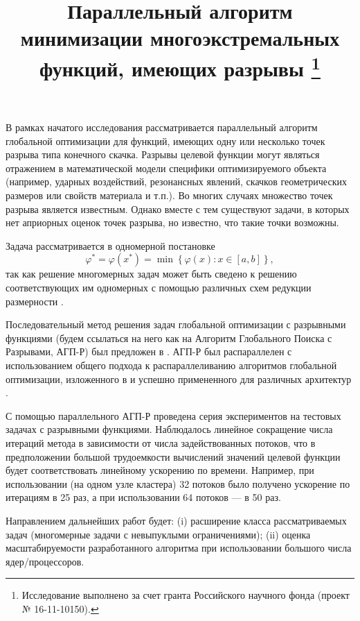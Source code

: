 \documentclass[11pt, oneside, a4paper]{article}
\begin{document}

\title{Параллельный алгоритм минимизации многоэкстремальных функций, имеющих разрывы \footnote{Исследование выполнено за счет гранта Российского научного фонда (проект № 16-11-10150).}}


В рамках начатого исследования рассматривается параллельный алгоритм глобальной оптимизации для функций, имеющих одну или несколько точек разрыва типа конечного скачка. Разрывы целевой функции могут являться отражением в математической модели специфики оптимизируемого объекта (например, ударных воздействий, резонансных явлений, скачков геометрических размеров или свойств материала и т.п.). Во многих случаях множество точек разрыва является известным. Однако вместе с тем существуют задачи, в которых нет априорных оценок точек разрыва, но известно, что такие точки возможны. 

Задача рассматривается в одномерной постановке
\[
\varphi^* = \varphi(x^*)=\min\left\{\varphi(x):x\in[a,b]\right\},
\] 
так как решение многомерных задач может быть сведено к решению соответствующих им одномерных с помощью различных схем редукции размерности \cite{Strongin91}.

Последовательный метод решения задач глобальной оптимизации с разрывными функциями (будем ссылаться на него как на Алгоритм Глобального Поиска с Разрывами, АГП-Р) был предложен в \cite{Strongin91}.
АГП-Р был распараллелен с использованием общего подхода к распараллеливанию алгоритмов глобальной оптимизации, изложенного в \cite{Strongin13} и успешно примененного для различных архитектур \cite{Barkalov14,Barkalov16}.

С помощью параллельного АГП-Р проведена серия экспериментов на тестовых задачах с разрывными функциями.
Наблюдалось линейное сокращение числа итераций метода в зависимости от числа задействованных потоков, что в предположении большой трудоемкости вычислений значений целевой функции будет соответствовать линейному ускорению по времени. Например, при использовании (на одном узле кластера) 32 потоков было получено ускорение по итерациям в 25 раз, а при использовании 64 потоков --- в 50 раз.

Направлением дальнейших работ будет: (i) расширение класса рассматриваемых задач (многомерные задачи с невыпуклыми ограничениями); (ii) оценка масштабируемости разработанного алгоритма при использовании большого числа ядер/процессоров.
\end{document}
